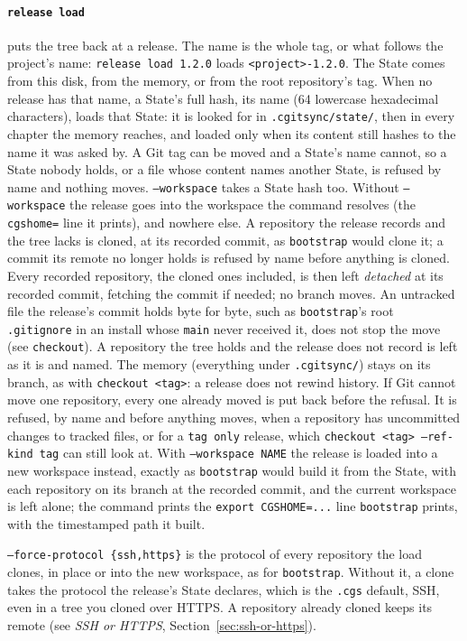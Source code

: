 \paragraph{\texttt{release load}} puts the tree back at a release. The name
is the whole tag, or what follows the project's name: \texttt{release load
1.2.0} loads \texttt{<project>-1.2.0}. The State comes from this disk, from
the memory, or from the root repository's tag. When no release has that name,
a State's full hash, its name (64 lowercase hexadecimal characters), loads
that State: it is looked for in \texttt{.cgitsync/state/}, then in every
chapter the memory reaches, and loaded only when its content still hashes to
the name it was asked by. A Git tag can be moved and a State's name cannot,
so a State nobody holds, or a file whose content names another State, is
refused by name and nothing moves. \texttt{--workspace} takes a State hash
too. Without \texttt{--workspace}
the release goes into the workspace the command resolves (the \texttt{cgshome=}
line it prints), and nowhere else. A repository the release records and the
tree lacks is cloned, at its recorded commit, as \texttt{bootstrap} would
clone it; a commit its remote no longer holds is refused by name before
anything is cloned. Every recorded repository, the cloned ones included, is
then left \emph{detached} at its recorded commit, fetching the commit if
needed; no branch moves. An untracked file the release's commit holds byte
for byte, such as \texttt{bootstrap}'s root \texttt{.gitignore} in an install
whose \texttt{main} never received it, does not stop the move (see
\texttt{checkout}). A repository the tree holds and the release does
not record is left as it is and named. The memory (everything under
\texttt{.cgitsync/}) stays on its branch, as with \texttt{checkout <tag>}: a
release does not rewind history. If Git cannot move one repository, every
one already moved is put back before the refusal. It is refused, by name and
before anything moves, when a repository has uncommitted changes to tracked
files, or for a \texttt{tag only} release, which \texttt{checkout <tag>
--ref-kind tag} can still look at. With \texttt{--workspace NAME} the release
is loaded into a new workspace instead, exactly as \texttt{bootstrap} would
build it from the State, with each repository on its branch at the recorded
commit, and the current workspace is left alone; the command prints the
\texttt{export CGSHOME=...} line \texttt{bootstrap} prints, with the
timestamped path it built.

\texttt{--force-protocol \{ssh,https\}} is the protocol of every repository
the load clones, in place or into the new workspace, as for
\texttt{bootstrap}. Without it, a clone takes the protocol the release's State
declares, which is the \texttt{.cgs} default, SSH, even in a tree you cloned
over HTTPS. A repository already cloned keeps its remote (see \emph{SSH or
HTTPS}, Section~\ref{sec:ssh-or-https}).

